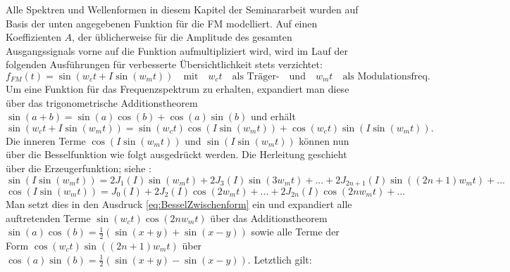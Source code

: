 Alle Spektren und Wellenformen in diesem Kapitel der Seminararbeit wurden auf Basis der unten angegebenen Funktion für die FM modelliert. Auf einen Koeffizienten $A$, der üblicherweise für die Amplitude des gesamten Ausgangssignals vorne auf die Funktion aufmultipliziert wird, wird im Lauf der folgenden Ausführungen für verbesserte Übersichtlichkeit stets verzichtet:
\label{matze:simplefm}
\begin{equation} \label{eq:SimpleFM}
f_{FM}(t) = \sin(w_ct + I\sin(w_mt)) \quad \text{mit} \quad w_ct \quad \text{als Träger-} \quad \text{und} \quad w_mt \quad \text{als Modulationsfreq.}
\end{equation}
Um eine Funktion für das Frequenzspektrum zu erhalten, expandiert man diese über das trigonometrische Additionstheorem \begin{math} \sin(a + b) = \sin(a)\cos(b)+\cos(a)\sin(b) \end{math} und erhält
\begin{equation}\label{eq:BesselZwischenform}
\sin(w_ct + I\sin(w_mt)) = \sin(w_ct)\cos(I\sin(w_mt)) + \cos(w_ct)\sin(I\sin(w_mt)).
\end{equation}
Die inneren Terme \begin{math} \cos(I\sin(w_mt)) \end{math} und \begin{math} \sin(I\sin(w_mt)) \end{math} können nun über die Besselfunktion wie folgt ausgedrückt werden. Die Herleitung geschieht über die Erzeugerfunktion; siehe \cite[S.361, Satz~9.1.42 und Satz~9.1.43]{abramowitz}:
\begin{equation}\label{eq:Besselsin}
\sin(I\sin(w_mt)) = 2J_1(I)\sin(w_mt)+2J_3(I)\sin(3w_mt)+...+2J_{2n+1}(I)\sin((2n+1)w_mt)+...
\end{equation}
\begin{equation}\label{eq:Besselcos}
\cos(I\sin(w_mt)) = J_0(I)+2J_2(I)\cos(2w_mt)+...+2J_{2n}(I)\cos(2nw_mt)+...
\end{equation}
Man setzt dies in den Ausdruck \ref{eq:BesselZwischenform} ein und expandiert alle auftretenden Terme \begin{math} \sin(w_ct)\cos(2nw_mt) \end{math} über das Additionstheorem \begin{math} \sin(a)\cos(b) = \frac{1}{2}\left(\sin(x+y)+\sin(x-y)\right) \end{math} sowie alle Terme der Form \begin{math} \cos(w_ct)\sin((2n+1)w_mt) \end{math} über  \begin{math} \cos(a)\sin(b) = \frac{1}{2}\left(\sin(x+y)-\sin(x-y)\right) \end{math}. Letztlich gilt: 
